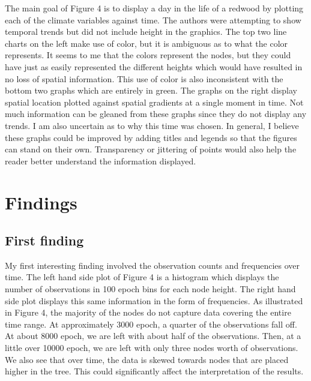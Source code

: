 \documentclass[11pt]{article}
\begin{document}
The main goal of Figure 4 is to display a day in the life of a redwood by plotting each of the climate variables against time. The authors were attempting to show temporal trends but did not include height in the graphics. The top two line charts on the left make use of color, but it is ambiguous as to what the color represents. It seems to me that the colors represent the nodes, but they could have just as easily represented the different heights which would have resulted in no loss of spatial information. This use of color is also inconsistent with the bottom two graphs which are entirely in green. The graphs on the right display spatial location plotted against spatial gradients at a single moment in time. Not much information can be gleaned from these graphs since they do not display any trends. I am also uncertain as to why this time was chosen. In general, I believe these graphs could be improved by adding titles and legends so that the figures can stand on their own. Transparency or jittering of points would also help the reader better understand the information displayed.  

\section{Findings}


\subsection{First finding}

My first interesting finding involved the observation counts and frequencies over time. The left hand side plot of Figure 4 is a histogram which displays the number of observations in 100 epoch bins for each node height. The right hand side plot displays this same information in the form of frequencies. As illustrated in Figure 4, the majority of the nodes do not capture data covering the entire time range. At approximately 3000 epoch, a quarter of the observations fall off. At about 8000 epoch, we are left with about half of the observations. Then, at a little over 10000 epoch, we are left with only three nodes worth of observations. We also see that over time, the data is skewed towards nodes that are placed higher in the tree. This could significantly affect the interpretation of the results. 
\end{document}
